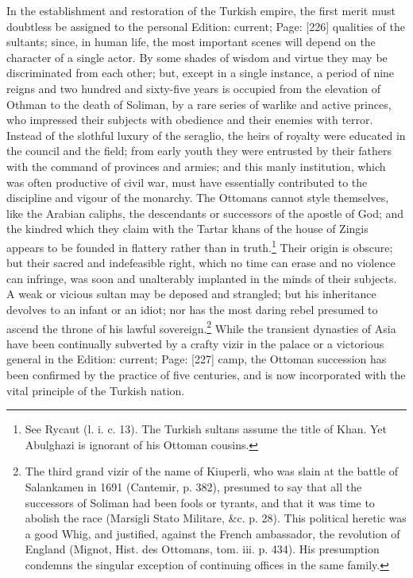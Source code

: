 In the establishment and restoration of the Turkish empire, the first merit must doubtless be assigned to the personal Edition: current; Page: [226] qualities of the sultants; since, in human life, the most important scenes will depend on the character of a single actor. By some shades of wisdom and virtue they may be discriminated from each other; but, except in a single instance, a period of nine reigns and two hundred and sixty-five years is occupied from the elevation of Othman to the death of Soliman, by a rare series of warlike and active princes, who impressed their subjects with obedience and their enemies with terror. Instead of the slothful luxury of the seraglio, the heirs of royalty were educated in the council and the field; from early youth they were entrusted by their fathers with the command of provinces and armies; and this manly institution, which was often productive of civil war, must have essentially contributed to the discipline and vigour of the monarchy. The Ottomans cannot style themselves, like the Arabian caliphs, the descendants or successors of the apostle of God; and the kindred which they claim with the Tartar khans of the house of Zingis appears to be founded in flattery rather than in truth.\footnote{See Rycaut (l. i. c. 13). The Turkish sultans assume the title of Khan. Yet Abulghazi is ignorant of his Ottoman cousins.} Their origin is obscure; but their sacred and indefeasible right, which no time can erase and no violence can infringe, was soon and unalterably implanted in the minds of their subjects. A weak or vicious sultan may be deposed and strangled; but his inheritance devolves to an infant or an idiot; nor has the most daring rebel presumed to ascend the throne of his lawful sovereign.\footnote{The third grand vizir of the name of Kiuperli, who was slain at the battle of Salankamen in 1691 (Cantemir, p. 382), presumed to say that all the successors of Soliman had been fools or tyrants, and that it was time to abolish the race (Marsigli Stato Militare, \&c. p. 28). This political heretic was a good Whig, and justified, against the French ambassador, the revolution of England (Mignot, Hist. des Ottomans, tom. iii. p. 434). His presumption condemns the singular exception of continuing offices in the same family.} While the transient dynasties of Asia have been continually subverted by a crafty vizir in the palace or a victorious general in the Edition: current; Page: [227] camp, the Ottoman succession has been confirmed by the practice of five centuries, and is now incorporated with the vital principle of the Turkish nation.


